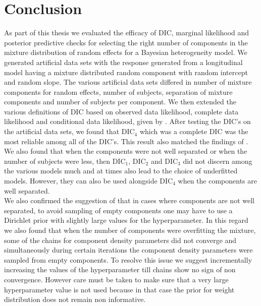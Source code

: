 
\chapter{Conclusion}
\label{ch : conclusion}

As part of this thesis we evaluated the efficacy of DIC, marginal likelihood and posterior predictive checks for selecting the right number of components in the mixture distribution of random effects for a Bayesian heterogeneity model. We generated artificial data sets with the response generated from a longitudinal model having a mixture distributed random component with random intercept and random slope. The various artificial data sets differed in number of mixture components for random effects, number of subjects, separation of mixture components and number of subjects per component. We then extended the various definitions of DIC based on observed data likelihood, complete data likelihood and conditional data likelihood, given by \citet{celeux_deviance_2006}. After testing the DIC's on the artificial data sets, we found that $\text{DIC}_4$ which was a complete DIC was the most reliable among all of the DIC's. This result also matched the findings of \citet{celeux_deviance_2006}. We also found that when the components were not well separated or when the number of subjects were less, then $\text{DIC}_1$, $\text{DIC}_2$ and $\text{DIC}_3$ did not discern among the various models much and at times also lead to the choice of underfitted models. However, they can also be used alongside $\text{DIC}_4$ when the components are well separated.\\

We also confirmed the suggestion of \citet{fruhwirth-schnatter_finite_2013} that in cases where components are not well separated, to avoid sampling of empty components one may have to use a Dirichlet prior with slightly large values for the hyperparameter. In this regard we also found that when the number of components were overfitting the mixture, some of the chains for component density parameters did not converge and simultaneously during certain iterations the component density parameters were sampled from empty components. To resolve this issue we suggest incrementally increasing the values of the hyperparameter till chains show no sign of non convergence. However care must be taken to make sure that a very large hyperparameter value is not used because in that case the prior for weight distribution does not remain non informative.\\

